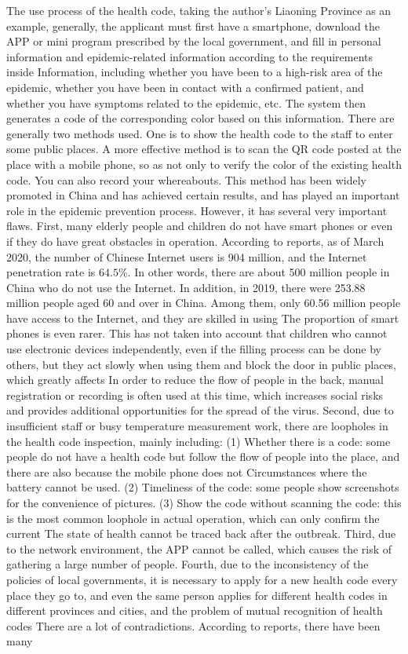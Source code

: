\documentclass[conference]{IEEEtran}
\begin{document}
\par The use process of the health code, taking the author's Liaoning Province as an example, generally, the applicant must first have a smartphone, download the APP or mini program prescribed by the local government, and fill in personal information and epidemic-related information according to the requirements inside Information, including whether you have been to a high-risk area of ​​the epidemic, whether you have been in contact with a confirmed patient, and whether you have symptoms related to the epidemic, etc. The system then generates a code of the corresponding color based on this information. There are generally two methods used. One is to show the health code to the staff to enter some public places. A more effective method is to scan the QR code posted at the place with a mobile phone, so as not only to verify the color of the existing health code. You can also record your whereabouts. This method has been widely promoted in China and has achieved certain results, and has played an important role in the epidemic prevention process. However, it has several very important flaws. First, many elderly people and children do not have smart phones or even if they do have great obstacles in operation. According to reports, as of March 2020, the number of Chinese Internet users is 904 million, and the Internet penetration rate is $64.5\%$. In other words, there are about 500 million people in China who do not use the Internet. In addition, in 2019, there were 253.88 million people aged 60 and over in China. Among them, only 60.56 million people have access to the Internet, and they are skilled in using The proportion of smart phones is even rarer. This has not taken into account that children who cannot use electronic devices independently, even if the filling process can be done by others, but they act slowly when using them and block the door in public places, which greatly affects In order to reduce the flow of people in the back, manual registration or recording is often used at this time, which increases social risks and provides additional opportunities for the spread of the virus. Second, due to insufficient staff or busy temperature measurement work, there are loopholes in the health code inspection, mainly including: (1) Whether there is a code: some people do not have a health code but follow the flow of people into the place, and there are also because the mobile phone does not Circumstances where the battery cannot be used. (2) Timeliness of the code: some people show screenshots for the convenience of pictures. (3) Show the code without scanning the code: this is the most common loophole in actual operation, which can only confirm the current The state of health cannot be traced back after the outbreak. Third, due to the network environment, the APP cannot be called, which causes the risk of gathering a large number of people. Fourth, due to the inconsistency of the policies of local governments, it is necessary to apply for a new health code every place they go to, and even the same person applies for different health codes in different provinces and cities, and the problem of mutual recognition of health codes There are a lot of contradictions. According to reports, there have been many 
\end{document}
